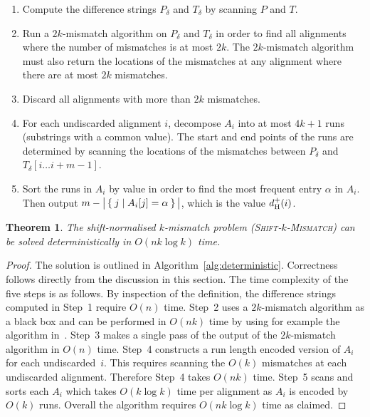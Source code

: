 \documentclass[11pt]{article}
\newcommand{\DsHam}{\ensuremath{d_\textup{H}^+}}
\newcommand{\skMismatch}{\textsc{Shift-$k$-Mismatch}\xspace}
\newcommand{\dHam}{\DsHam}
\theoremstyle{plain}
\newtheorem{theorem}{Theorem}[]
\theoremstyle{definition}
\begin{document}
\begin{algorithm}[t]
    \caption{Overview of deterministic solution to \skMismatch.
        \label{alg:deterministic}}
    \begin{enumerate}
        \item Compute the difference strings $P_\delta$ and $T_\delta$ by scanning $P$ and $T$.
        \item Run a $2k$-mismatch algorithm on $P_\delta$ and $T_\delta$ in order to find all alignments where the number of mismatches is at most $2k$. The $2k$-mismatch algorithm must also return the locations of the mismatches at any alignment where there are at most $2k$ mismatches.
        \item Discard all alignments with more than $2k$ mismatches.
        \item For each undiscarded alignment $i$, decompose $A_i$ into at most $4k+1$ runs (substrings with a common value). The start and end points of the runs are determined by scanning the locations of the  mismatches between $P_\delta$ and $T_\delta[i \ldots i+m-1]$.
        \item Sort the runs in $A_i$ by value in order to find the most frequent entry $\alpha$ in $A_i$. Then output $m-\big|\Set{ j | A_i[j]=\alpha }\big|$, which is the value $\dHam(i)$.
    \end{enumerate}
    \vspace{-8pt}
\end{algorithm}


\begin{theorem}
    \label{thm:detkmis}
    The shift-normalised $k$-mismatch problem (\skMismatch) can be solved deterministically in $O(n k \log k)$ time.
\end{theorem}
\begin{proof}
    The solution is outlined in Algorithm~\ref{alg:deterministic}. Correctness follows directly from the discussion in this section. The time complexity of the five steps is as follows. By inspection of the definition, the difference strings computed in Step~1 require $O(n)$ time. Step~2 uses a $2k$-mismatch algorithm as a black box and can be performed in $O(nk)$ time by using for example the algorithm in~\cite{LV:1986a}. Step~3 makes a single pass of the output of the $2k$-mismatch algorithm in $O(n)$ time. Step~4 constructs a run length encoded version of $A_i$ for each undiscarded~$i$. This requires scanning the $O(k)$ mismatches at each undiscarded alignment. Therefore Step~4 takes $O(nk)$ time. Step~5 scans and sorts each $A_i$ which takes $O(k \log k)$ time per alignment as $A_i$ is encoded by $O(k)$ runs. Overall the algorithm requires $O(nk \log k)$ time as claimed.
\end{proof}
\end{document}
